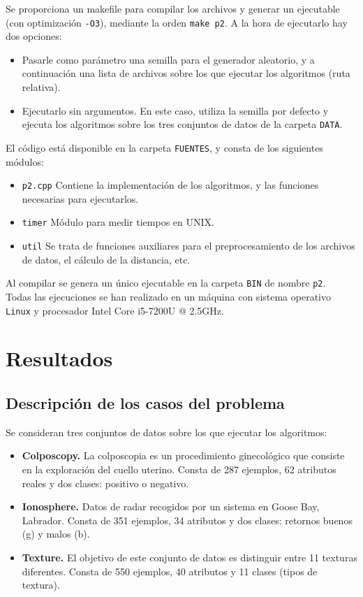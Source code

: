 \documentclass[12pt]{article}
\begin{document}
Se proporciona un makefile para compilar los archivos y generar un ejecutable (con optimización \verb|-O3|), mediante la orden \verb|make p2|. A la hora de ejecutarlo hay dos opciones:

\begin{itemize}
    \item Pasarle como parámetro una semilla para el generador aleatorio, y a continuación una lista de archivos sobre los que ejecutar los algoritmos (ruta relativa).
    \item Ejecutarlo sin argumentos. En este caso, utiliza la semilla por defecto y ejecuta los algoritmos sobre los tres conjuntos de datos de la carpeta \verb|DATA|.
\end{itemize}

El código está disponible en la carpeta \verb|FUENTES|, y consta de los siguientes módulos:

\begin{itemize}
	\item \verb|p2.cpp| Contiene la implementación de los algoritmos, y las funciones necesarias para ejecutarlos.
	\item \verb|timer| Módulo para medir tiempos en UNIX.
	\item \verb|util| Se trata de funciones auxiliares para el preprocesamiento de los archivos de datos, el cálculo de la distancia, etc.
\end{itemize}

Al compilar se genera un único ejecutable en la carpeta \verb|BIN| de nombre \verb|p2|.\\

Todas las ejecuciones se han realizado en un máquina con sistema operativo \verb|Linux| y procesador Intel Core i5-7200U @ 2.5GHz.

\newpage

\section{Resultados}

\subsection*{Descripción de los casos del problema}
\label{casos}

Se consideran tres conjuntos de datos sobre los que ejecutar los algoritmos:

\begin{itemize}
	\item \textbf{Colposcopy.} La colposcopia es un procedimiento ginecológico que
consiste en la exploración del cuello uterino. Consta de 287 ejemplos, 62 atributos reales y dos clases: positivo o negativo.
    \item \textbf{Ionosphere.} Datos de radar recogidos por un sistema en Goose Bay, Labrador. Consta de 351 ejemplos, 34 atributos y dos clases: retornos buenos (g) y malos (b).
    \item \textbf{Texture.} El objetivo de este conjunto de datos es distinguir entre 11
texturas diferentes. Consta de 550 ejemplos, 40 atributos y 11 clases (tipos de textura).
\end{itemize}
\end{document}
